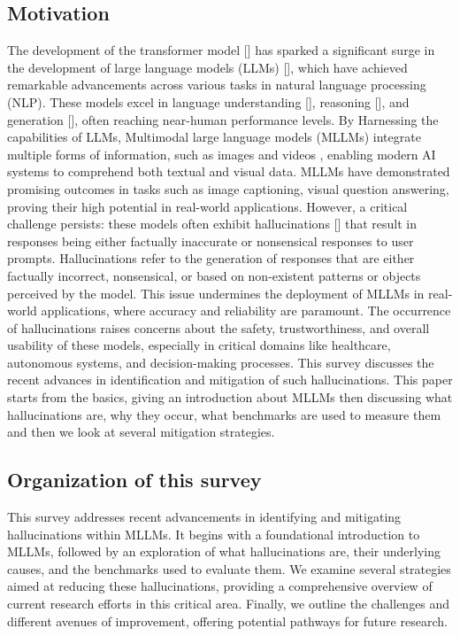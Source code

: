 \documentclass[twocolumn, 9pt]{extarticle}
\begin{document}
\subsection{Motivation}
The development of the transformer model [] has sparked a significant surge in the development of large language models (LLMs) [], which have achieved remarkable advancements across various tasks in natural language processing (NLP). These models excel in language understanding [], reasoning [], and generation [], often reaching near-human performance levels.  By Harnessing the capabilities of LLMs, Multimodal large language models (MLLMs) integrate multiple forms of information, such as images and videos , enabling modern AI systems to comprehend both textual and visual data. MLLMs have demonstrated promising outcomes in tasks such as image captioning, visual question answering, proving their high potential in real-world applications. However, a critical challenge persists: these models often exhibit hallucinations [] that result in responses being either factually inaccurate or nonsensical responses to user prompts.  Hallucinations refer to the generation of responses that are either factually incorrect, nonsensical, or based on non-existent patterns or objects perceived by the model. This issue undermines the deployment of MLLMs in real-world applications, where accuracy and reliability are paramount. The occurrence of hallucinations raises concerns about the safety, trustworthiness, and overall usability of these models, especially in critical domains like healthcare, autonomous systems, and decision-making processes. This survey discusses the recent advances in identification and mitigation of such hallucinations. This paper starts from the basics, giving an introduction about MLLMs then discussing what hallucinations are, why they occur, what benchmarks are used to measure them and then we look at several mitigation strategies. 

\subsection{Organization of this survey}
This survey addresses recent advancements in identifying and mitigating hallucinations within MLLMs. It begins with a foundational introduction to MLLMs, followed by an exploration of what hallucinations are, their underlying causes, and the benchmarks used to evaluate them. We examine several strategies aimed at reducing these hallucinations, providing a comprehensive overview of current research efforts in this critical area. Finally, we outline the challenges and different avenues of improvement, offering potential pathways for future research. 
\end{document}
